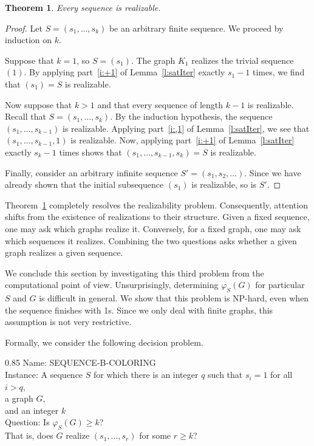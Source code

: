 \documentclass{article}
\newtheorem{theorem}{Theorem}[section]
\theoremstyle{definition}
\begin{document}
\medskip

\begin{theorem}\label{t:finSeqSat}
Every sequence is realizable.
\end{theorem}

\begin{proof}
Let $S=(s_1,\ldots,s_k)$ be an arbitrary finite sequence.
We proceed by induction on $k$.

Suppose that $k=1$, so $S=(s_1)$. The graph $K_1$ realizes the trivial sequence $(1)$. By applying part~\ref{i:+1} of Lemma~\ref{l:satIter} 
exactly $s_1-1$ times, we find that $(s_1)=S$ is realizable.

Now suppose that $k>1$ and that every sequence of length $k-1$ is realizable. Recall that $S=(s_1,\ldots,s_k)$. By the induction hypothesis, the sequence $(s_1,\ldots,s_{k-1})$ is realizable. Applying part~\ref{i:,1} of Lemma~\ref{l:satIter}, we see that $(s_1,\ldots,s_{k-1},1)$ is realizable. Now, applying part~\ref{i:+1} of Lemma~\ref{l:satIter} exactly $s_k-1$ times 
shows that $(s_1,\ldots,s_{k-1},s_k)=S$ is realizable.

Finally, consider an arbitrary infinite sequence $S'=(s_1,s_2,\ldots)$.
Since we have already shown that the initial subsequence $(s_1)$ is realizable, so is $S'$.
\end{proof}

\medskip

Theorem~\ref{t:finSeqSat} 
completely resolves
the realizability problem.
Consequently, attention shifts from the existence of realizations to their structure. 
Given a fixed sequence, one may ask which graphs realize it. 
Conversely, for a fixed graph, one may ask which sequences it realizes.
Combining the two questions asks whether a given graph realizes a given sequence.

We conclude this section by investigating this third problem from the computational point of view. 
Unsurprisingly, determining $\varphi_S(G)$ for particular $S$ and $G$ is difficult in general. We show that this problem is NP-hard, even when the sequence finishes with 1s. Since we only deal with finite graphs, this assumption is not very restrictive.

Formally, we consider the following decision problem.

\begin{boxedminipage}{0.85\textwidth}
{\sc Name}: SEQUENCE-B-COLORING\\
{\sc Instance:} A sequence $S$ for which there is an integer $q$ such that $s_i=1$ for all $i>q$,\\
\hspace*{.71in}a graph $G$,\\
\hspace*{.71in}and an integer $k$\\
{\sc Question:} Is $\varphi_S(G)\geq k$?\\
\hspace*{.73in}That is, does $G$ realize $(s_1,\ldots,s_r)$ for some $r\geq k$?
\end{boxedminipage}
\end{document}
